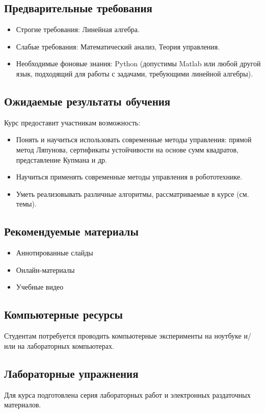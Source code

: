 \documentclass[11pt,a4paper]{article}
\begin{document}
\subsection{Предварительные требования}

\begin{itemize}
	\item Строгие требования: Линейная алгебра.
	\item Слабые требования: Математический анализ, Теория управления.
	\item Необходимые фоновые знания: Python (допустимы Matlab или любой другой язык, подходящий для работы с задачами, требующими линейной алгебры).
\end{itemize}

\subsection{Ожидаемые результаты обучения}

Курс предоставит участникам возможность:
\begin{itemize}
	\item Понять и научиться использовать современные методы управления: прямой метод Ляпунова, сертификаты устойчивости на основе сумм квадратов, представление Купмана и др.
	\item Научиться применять современные методы управления в робототехнике.
	\item Уметь реализовывать различные алгоритмы, рассматриваемые в курсе (см. темы).
\end{itemize}

\subsection{Рекомендуемые материалы}
\begin{itemize}
	\item Аннотированные слайды
	\item Онлайн-материалы
	\item Учебные видео
\end{itemize}

\subsection{Компьютерные ресурсы}
Студентам потребуется проводить компьютерные эксперименты на ноутбуке и/или на лабораторных компьютерах.

\subsection{Лабораторные упражнения}
Для курса подготовлена серия лабораторных работ и электронных раздаточных материалов.
\end{document}
